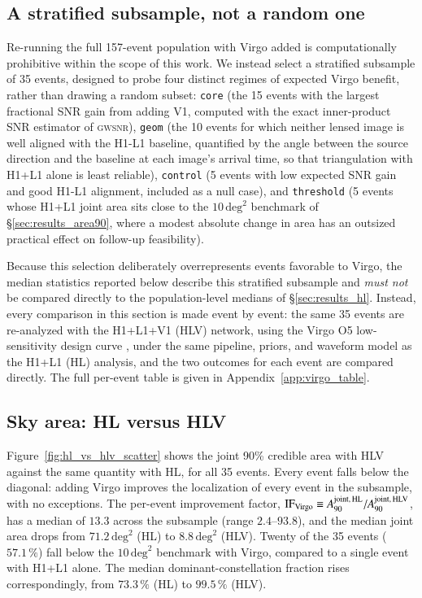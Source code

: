 \documentclass{aa}
\begin{document}
\subsection{A stratified subsample, not a random one}
\label{sec:virgo_subsample}

Re-running the full 157-event population with Virgo added is
computationally prohibitive within the scope of this work. We instead
select a stratified subsample of 35 events, designed to probe four distinct
regimes of expected Virgo benefit, rather than drawing a random subset:
\texttt{core} (the 15 events with the largest fractional SNR gain from
adding V1, computed with the exact inner-product SNR estimator of
\textsc{gwsnr}), \texttt{geom} (the 10 events for which neither lensed image
is well aligned with the H1-L1 baseline, quantified by the angle between the
source direction and the baseline at each image's arrival time, so that
triangulation with H1+L1 alone is least reliable), \texttt{control} (5
events with low expected SNR gain and good H1-L1 alignment, included as a
null case), and \texttt{threshold} (5 events whose H1+L1 joint area sits
close to the $10\,\mathrm{deg}^2$ benchmark of \S\ref{sec:results_area90},
where a modest absolute change in area has an outsized practical effect on
follow-up feasibility).

Because this selection deliberately overrepresents events favorable to
Virgo, the median statistics reported below describe this stratified
subsample and \emph{must not} be compared directly to the population-level
medians of \S\ref{sec:results_hl}. Instead, every comparison in this
section is made event by event: the same 35 events are re-analyzed with the
H1+L1+V1 (HLV) network, using the Virgo O5 low-sensitivity design curve
\citep{virgo_o5_psd}, under the same pipeline, priors, and waveform model as
the H1+L1 (HL) analysis, and the two outcomes for each event are compared
directly. The full per-event table is given in
Appendix~\ref{app:virgo_table}.

\subsection{Sky area: HL versus HLV}
\label{sec:virgo_area}

Figure~\ref{fig:hl_vs_hlv_scatter} shows the joint 90\% credible area with
HLV against the same quantity with HL, for all 35 events. Every event falls
below the diagonal: adding Virgo improves the localization of every event
in the subsample, with no exceptions. The per-event improvement factor,
$\mathrm{IF}_{\rm Virgo} \equiv A_{90}^{\rm joint,\,HL}/A_{90}^{\rm joint,\,HLV}$,
has a median of $13.3$ across the subsample (range $2.4$--$93.8$), and the
median joint area drops from $71.2\,\mathrm{deg}^2$ (HL) to
$8.8\,\mathrm{deg}^2$ (HLV). Twenty of the 35 events ($57.1\,\%$) fall below
the $10\,\mathrm{deg}^2$ benchmark with Virgo, compared to a single event
with H1+L1 alone. The median dominant-constellation fraction rises
correspondingly, from $73.3\,\%$ (HL) to $99.5\,\%$ (HLV).
\end{document}
